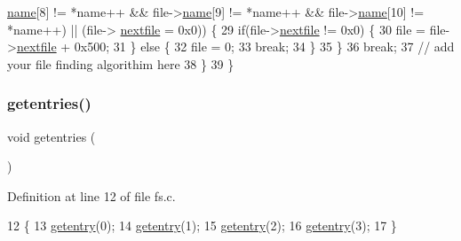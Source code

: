 \begin{DoxyCode}
      \hyperlink{a00336_a07ecc9bacdc2943442f26f62f6749055_a07ecc9bacdc2943442f26f62f6749055}{name}[8] != *name++ && file->\hyperlink{a00336_a07ecc9bacdc2943442f26f62f6749055_a07ecc9bacdc2943442f26f62f6749055}{name}[9] != *name++ && file->\hyperlink{a00336_a07ecc9bacdc2943442f26f62f6749055_a07ecc9bacdc2943442f26f62f6749055}{name}[10] != *name++) || (file->
      \hyperlink{a00336_aa2c7e2e1b3827ce9fbaa045b89202784_aa2c7e2e1b3827ce9fbaa045b89202784}{nextfile} = 0x0)) \{
29                 \textcolor{keywordflow}{if}(file->\hyperlink{a00336_aa2c7e2e1b3827ce9fbaa045b89202784_aa2c7e2e1b3827ce9fbaa045b89202784}{nextfile} != 0x0) \{
30                     file = file->\hyperlink{a00336_aa2c7e2e1b3827ce9fbaa045b89202784_aa2c7e2e1b3827ce9fbaa045b89202784}{nextfile} + 0x500;
31                 \} \textcolor{keywordflow}{else} \{
32                     file = 0;
33                     \textcolor{keywordflow}{break};
34                 \}
35             \}
36             \textcolor{keywordflow}{break};
37         \textcolor{comment}{// add your file finding algorithim here}
38     \}
39 \}
\end{DoxyCode}
\mbox{\label{a00149_a414110036132977c34813673360e1a63_a414110036132977c34813673360e1a63}} 
\subsubsection{\texorpdfstring{getentries()}{getentries()}}
{\footnotesize\ttfamily void getentries (\begin{DoxyParamCaption}{ }\end{DoxyParamCaption})}



Definition at line 12 of file fs.\+c.


\begin{DoxyCode}
12                   \{
13     \hyperlink{a00149_a3fb32d07d3bd05144a196c94fc59c0d1_a3fb32d07d3bd05144a196c94fc59c0d1}{getentry}(0);
14     \hyperlink{a00149_a3fb32d07d3bd05144a196c94fc59c0d1_a3fb32d07d3bd05144a196c94fc59c0d1}{getentry}(1);
15     \hyperlink{a00149_a3fb32d07d3bd05144a196c94fc59c0d1_a3fb32d07d3bd05144a196c94fc59c0d1}{getentry}(2);
16     \hyperlink{a00149_a3fb32d07d3bd05144a196c94fc59c0d1_a3fb32d07d3bd05144a196c94fc59c0d1}{getentry}(3);
17 \}
\end{DoxyCode}
\mbox{\label{a00149_a3fb32d07d3bd05144a196c94fc59c0d1_a3fb32d07d3bd05144a196c94fc59c0d1}} 
